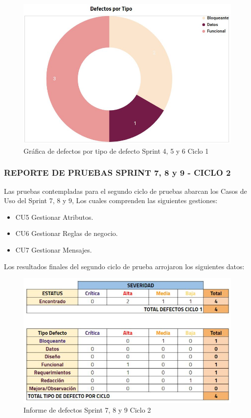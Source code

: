 \begin{figure}[H]
	\begin{center}
		\includegraphics[width=.65\textwidth]{images/pruebas/s4c2-2}
		\caption{Gráfica de defectos por tipo de defecto Sprint 4, 5 y 6  Ciclo 1}
		\label{fig:infos4c2-2}
	\end{center}
\end{figure}

\subsubsection{REPORTE DE PRUEBAS SPRINT 7, 8 y 9 - CICLO 2}

Las pruebas contempladas para el segundo ciclo de pruebas abarcan los Casos de Uso del Sprint 7, 8 y 9, Los cuales comprenden las siguientes gestiones:

\begin{itemize}
	\item CU5 Gestionar Atributos.
	\item CU6 Gestionar Reglas de negocio.
	\item CU7 Gestionar Mensajes.
\end{itemize}

Los resultados finales del segundo ciclo de prueba arrojaron los siguientes datos:

\begin{figure}[H]
	\begin{center}
		\includegraphics[width=.95\textwidth]{images/pruebas/s7c2}
		\caption{Informe de defectos Sprint 7, 8 y 9  Ciclo 2}
		\label{fig:infos7c2}
	\end{center}
\end{figure}

